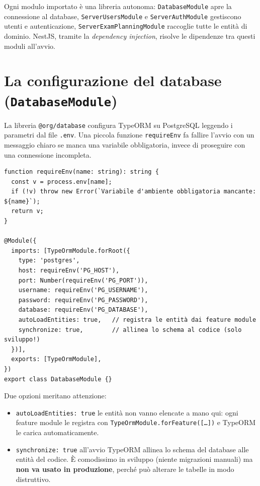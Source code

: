 \documentclass[11pt,a4paper,oneside]{report}
\newcommand{\code}[1]{\texttt{\small #1}}
\newcommand{\file}[1]{\texttt{\small #1}}
\begin{document}
Ogni modulo importato è una libreria autonoma: \code{DatabaseModule} apre la
connessione al database, \code{ServerUsersModule} e \code{ServerAuthModule}
gestiscono utenti e autenticazione, \code{ServerExamPlanningModule} raccoglie
tutte le entità di dominio. NestJS, tramite la \emph{dependency injection},
risolve le dipendenze tra questi moduli all'avvio.

\section{La configurazione del database (\texttt{DatabaseModule})}
La libreria \code{@org/database} configura TypeORM su PostgreSQL leggendo i
parametri dal file \file{.env}. Una piccola funzione \code{requireEnv} fa
fallire l'avvio con un messaggio chiaro se manca una variabile obbligatoria,
invece di proseguire con una connessione incompleta.

\begin{lstlisting}[caption={\file{libs/database/src/lib/database.module.ts}.}]
function requireEnv(name: string): string {
  const v = process.env[name];
  if (!v) throw new Error(`Variabile d'ambiente obbligatoria mancante: ${name}`);
  return v;
}

@Module({
  imports: [TypeOrmModule.forRoot({
    type: 'postgres',
    host: requireEnv('PG_HOST'),
    port: Number(requireEnv('PG_PORT')),
    username: requireEnv('PG_USERNAME'),
    password: requireEnv('PG_PASSWORD'),
    database: requireEnv('PG_DATABASE'),
    autoLoadEntities: true,   // registra le entità dai feature module
    synchronize: true,        // allinea lo schema al codice (solo sviluppo!)
  })],
  exports: [TypeOrmModule],
})
export class DatabaseModule {}
\end{lstlisting}

Due opzioni meritano attenzione:

\begin{itemize}[leftmargin=1.4em]
  \item \code{autoLoadEntities: true} \textemdash{} le entità non vanno elencate
        a mano qui: ogni feature module le registra con
        \code{TypeOrmModule.forFeature([\ldots])} e TypeORM le carica
        automaticamente.
  \item \code{synchronize: true} \textemdash{} all'avvio TypeORM allinea lo
        schema del database alle entità del codice. È comodissimo in sviluppo
        (niente migrazioni manuali) ma \textbf{non va usato in produzione},
        perché può alterare le tabelle in modo distruttivo.
\end{itemize}
\end{document}
